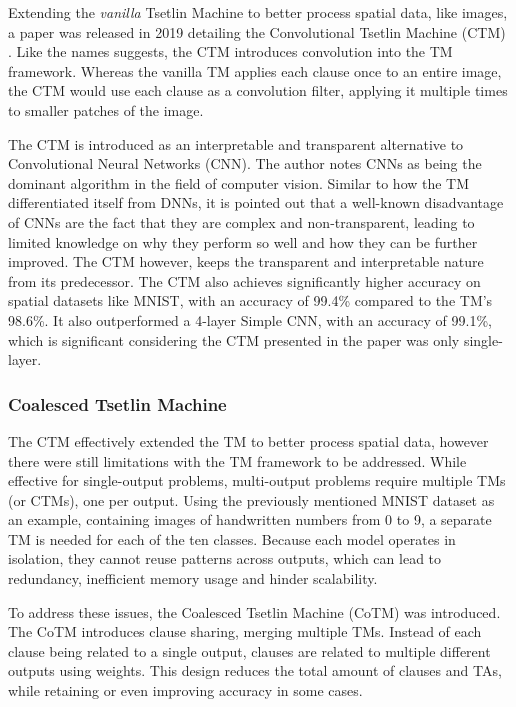 Extending the \textit{vanilla} Tsetlin Machine to better process spatial data, like images, a paper was released in 2019 detailing the Convolutional Tsetlin Machine (CTM) \cite{GranmoOle-Christoffer2019TCTM}. Like the names suggests, the CTM introduces convolution into the TM framework. Whereas the vanilla TM applies each clause once to an entire image, the CTM would use each clause as a convolution filter, applying it multiple times to smaller patches of the image. 

The CTM is introduced as an interpretable and transparent alternative to Convolutional Neural Networks (CNN). The author notes CNNs as being the dominant algorithm in the field of computer vision. Similar to how the TM differentiated itself from DNNs, it is pointed out that a well-known disadvantage of CNNs are the fact that they are complex and non-transparent, leading to limited knowledge on why they perform so well and how they can be further improved. The CTM however, keeps the transparent and interpretable nature from its predecessor. The CTM also achieves significantly higher accuracy on spatial datasets like MNIST, with an accuracy of 99.4\% compared to the TM's 98.6\%. It also outperformed a 4-layer Simple CNN, with an accuracy of 99.1\%, which is significant considering the CTM presented in the paper was only single-layer. 

\subsubsection{Coalesced Tsetlin Machine}

The CTM effectively extended the TM to better process spatial data, however there were still limitations with the TM framework to be addressed. While effective for single-output problems, multi-output problems require multiple TMs (or CTMs), one per output. Using the previously mentioned MNIST dataset as an example, containing images of handwritten numbers from 0 to 9, a separate TM is needed for each of the ten classes. Because each model operates in isolation, they cannot reuse patterns across outputs, which can lead to redundancy, inefficient memory usage and hinder scalability. 

To address these issues, the Coalesced Tsetlin Machine (CoTM)  was introduced\cite{GlimsdalSondre2021CMTM}. The CoTM introduces clause sharing, merging multiple TMs. Instead of each clause being related to a single output, clauses are related to multiple different outputs using weights. This design reduces the total amount of clauses and TAs, while retaining or even improving accuracy in some cases. 

